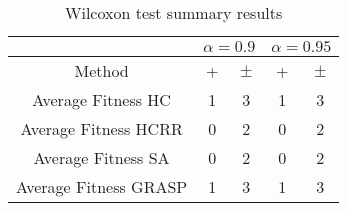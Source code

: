 \documentclass[a4paper,10pt]{article}
\begin{document}
\begin{table}[!htp]
\centering\scriptsize
\begin{tabular}{
|c|c|c|c|c|}
\hline
&\multicolumn{2}{c|}{$\alpha=0.9$} & \multicolumn{2}{c|}{$\alpha=0.95$}\\\hline
Method & + & $\pm$ & + & $\pm$ \\
\hline
Average Fitness HC     & 1 & 3 & 1 & 3\\
\hline
Average Fitness HCRR    & 0 & 2 & 0 & 2\\
\hline
Average Fitness SA   & 0 & 2 & 0 & 2\\
\hline
Average Fitness GRASP & 1 & 3 & 1 & 3\\
\hline

\end{tabular}
\caption{Wilcoxon test summary results}

\end{table}

 \clearpage 
\end{document}
